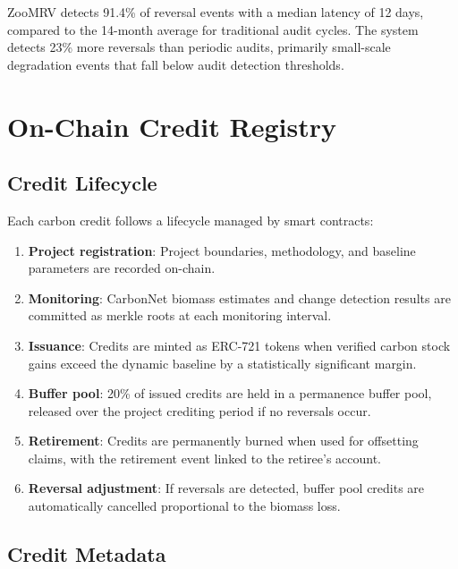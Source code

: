 \documentclass[11pt,a4paper]{article}
\begin{document}
ZooMRV detects 91.4\% of reversal events with a median latency of 12
days, compared to the 14-month average for traditional audit cycles.
The system detects 23\% more reversals than periodic audits, primarily
small-scale degradation events that fall below audit detection
thresholds.


\section{On-Chain Credit Registry}
\label{sec:registry}

\subsection{Credit Lifecycle}

Each carbon credit follows a lifecycle managed by smart contracts:

\begin{enumerate}
  \item \textbf{Project registration}: Project boundaries, methodology,
    and baseline parameters are recorded on-chain.
  \item \textbf{Monitoring}: CarbonNet biomass estimates and change
    detection results are committed as merkle roots at each monitoring
    interval.
  \item \textbf{Issuance}: Credits are minted as ERC-721 tokens when
    verified carbon stock gains exceed the dynamic baseline by a
    statistically significant margin.
  \item \textbf{Buffer pool}: 20\% of issued credits are held in a
    permanence buffer pool, released over the project crediting period
    if no reversals occur.
  \item \textbf{Retirement}: Credits are permanently burned when used
    for offsetting claims, with the retirement event linked to the
    retiree's account.
  \item \textbf{Reversal adjustment}: If reversals are detected, buffer
    pool credits are automatically cancelled proportional to the
    biomass loss.
\end{enumerate}

\subsection{Credit Metadata}
\end{document}
